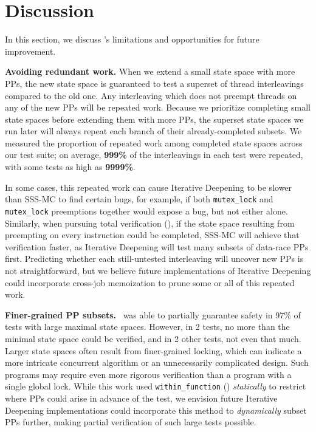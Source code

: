 
\section{Discussion}
\label{sec:future}

In this section, we discuss \quicksand's limitations and opportunities for future improvement.

{\bf Avoiding redundant work.}
When we extend a small state space with more PPs, the new state space is guaranteed to test a superset of thread interleavings compared to the old one.
Any interleaving which does not preempt threads on any of the new PPs will be repeated work.
Because we prioritize completing small state spaces before extending them with more PPs,
the superset state spaces we run later will always repeat each branch of their already-completed subsets.
%
We measured the proportion of repeated work among completed state spaces across our test suite;
on average, {\bf \large 999\%} of the interleavings in each test were repeated, with some tests as high as {\bf \large 9999\%}.

In some cases, this repeated work can cause Iterative Deepening to be slower than SSS-MC to find certain bugs,
for example, if both {\tt mutex\_lock} and {\tt mutex\_lock} preemptions together would expose a bug, but not either alone.
Similarly, when pursuing total verification (\sect{\ref{sec:totalverif}}),
if the state space resulting from preempting on every instruction could be completed,
SSS-MC will achieve that verification faster, as Iterative Deepening will test many subsets of data-race PPs first.
Predicting whether each still-untested interleaving will uncover new PPs is not straightforward,
but we believe future implementations of Iterative Deepening could incorporate cross-job memoization
to prune some or all of this repeated work.

{\bf Finer-grained PP subsets.}
\quicksand~was able to partially guarantee safety in 97\% of tests with large maximal state spaces.
However, in 2 tests, no more than the minimal state space could be verified,
and in 2 other tests, not even that much.
Larger state spaces often result from finer-grained locking,
which can indicate a more intricate concurrent algorithm or an unnecessarily complicated design.
Such programs may require even more rigorous verification than a program with a single global lock.
While this work used {\tt within\_function} (\sect{\ref{sec:landslide}}) {\em statically} to restrict where PPs could arise in advance of the test,
we envision future Iterative Deepening implementations could incorporate this method to {\em dynamically} subset PPs further,
making partial verification of such large tests possible.

